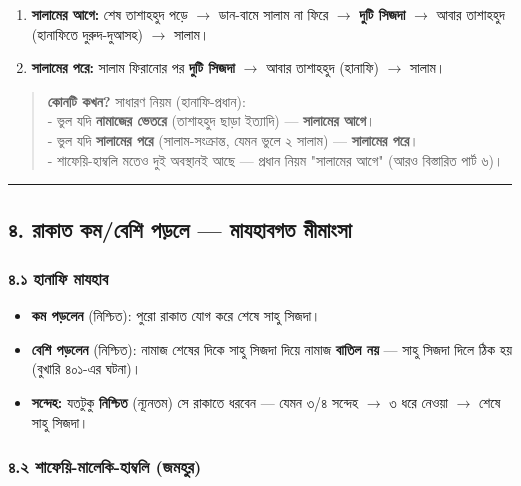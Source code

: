 \begin{enumerate}
\item \textbf{সালামের আগে:} শেষ তাশাহহুদ পড়ে $\rightarrow$ ডান-বামে সালাম না ফিরে $\rightarrow$ \textbf{দুটি সিজদা} $\rightarrow$ আবার তাশাহহুদ (হানাফিতে দুরুদ-দুআসহ) $\rightarrow$ সালাম।
\item \textbf{সালামের পরে:} সালাম ফিরানোর পর \textbf{দুটি সিজদা} $\rightarrow$ আবার তাশাহহুদ (হানাফি) $\rightarrow$ সালাম।
\end{enumerate}
\begin{quote}
\textbf{কোনটি কখন?} সাধারণ নিয়ম (হানাফি-প্রধান): \\
- ভুল যদি \textbf{নামাজের ভেতরে} (তাশাহহুদ ছাড়া ইত্যাদি) — \textbf{সালামের আগে}। \\
- ভুল যদি \textbf{সালামের পরে} (সালাম-সংক্রান্ত, যেমন ভুলে ২ সালাম) — \textbf{সালামের পরে}। \\
- শাফেয়ি-হাম্বলি মতেও দুই অবস্থানই আছে — প্রধান নিয়ম "সালামের আগে" (আরও বিস্তারিত পার্ট ৬)।
\end{quote}

\medskip\hrule\medskip

\subsection*{৪. রাকাত কম/বেশি পড়লে — মাযহাবগত মীমাংসা}

\subsubsection*{৪.১ হানাফি মাযহাব}

\begin{itemize}
\item \textbf{কম পড়লেন} (নিশ্চিত): পুরো রাকাত যোগ করে শেষে সাহু সিজদা।
\item \textbf{বেশি পড়লেন} (নিশ্চিত): নামাজ শেষের দিকে সাহু সিজদা দিয়ে নামাজ \textbf{বাতিল নয়} — সাহু সিজদা দিলে ঠিক হয় (বুখারি ৪০১-এর ঘটনা)।
\item \textbf{সন্দেহ:} যতটুকু \textbf{নিশ্চিত} (ন্যূনতম) সে রাকাতে ধরবেন — যেমন ৩/৪ সন্দেহ $\rightarrow$ ৩ ধরে নেওয়া $\rightarrow$ শেষে সাহু সিজদা।
\end{itemize}
\subsubsection*{৪.২ শাফেয়ি-মালেকি-হাম্বলি (জমহুর)}

